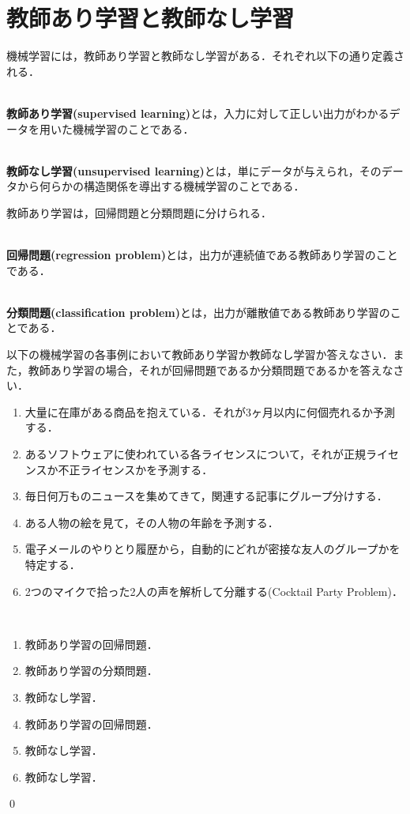 \section{教師あり学習と教師なし学習}

機械学習には，教師あり学習と教師なし学習がある．それぞれ以下の通り定義される．
\begin{defi}[教師あり学習]
　\\
{\bf 教師あり学習(supervised learning)}とは，入力に対して正しい出力がわかるデータを用いた機械学習のことである．
\end{defi}
\begin{defi}[教師なし学習]
　\\
{\bf 教師なし学習(unsupervised learning)}とは，単にデータが与えられ，そのデータから何らかの構造関係を導出する機械学習のことである．
\end{defi}

教師あり学習は，回帰問題と分類問題に分けられる．
\begin{defi}[回帰問題]
　\\
{\bf 回帰問題(regression problem)}とは，出力が連続値である教師あり学習のことである．
\end{defi}
\begin{defi}[分類問題]
　\\
{\bf 分類問題(classification problem)}とは，出力が離散値である教師あり学習のことである．
\end{defi}

\begin{qu}
以下の機械学習の各事例において教師あり学習か教師なし学習か答えなさい．また，教師あり学習の場合，それが回帰問題であるか分類問題であるかを答えなさい．
\begin{enumerate}
	\item 大量に在庫がある商品を抱えている．それが3ヶ月以内に何個売れるか予測する．
	\item あるソフトウェアに使われている各ライセンスについて，それが正規ライセンスか不正ライセンスかを予測する．
	\item 毎日何万ものニュースを集めてきて，関連する記事にグループ分けする．
	\item ある人物の絵を見て，その人物の年齢を予測する．
	\item 電子メールのやりとり履歴から，自動的にどれが密接な友人のグループかを特定する．
	\item 2つのマイクで拾った2人の声を解析して分離する(Cocktail Party Problem)．
\end{enumerate}	
\end{qu}
\begin{ans}　
\begin{enumerate}
	\item 教師あり学習の回帰問題．
	\item 教師あり学習の分類問題．
	\item 教師なし学習．
	\item 教師あり学習の回帰問題．
	\item 教師なし学習．
	\item 教師なし学習．
\end{enumerate}
\qed
\end{ans}